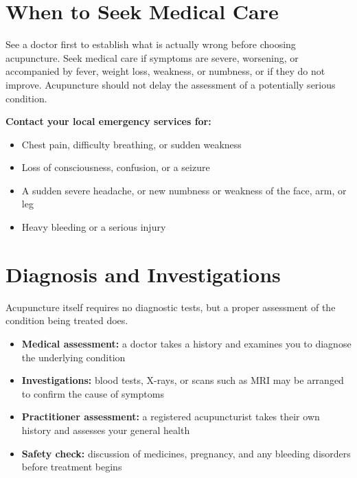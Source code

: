 \section*{When to Seek Medical Care}
See a doctor first to establish what is actually wrong before choosing acupuncture. Seek medical care if symptoms are severe, worsening, or accompanied by fever, weight loss, weakness, or numbness, or if they do not improve. Acupuncture should not delay the assessment of a potentially serious condition.

\textbf{Contact your local emergency services for:}
\begin{itemize}
    \item Chest pain, difficulty breathing, or sudden weakness
    \item Loss of consciousness, confusion, or a seizure
    \item A sudden severe headache, or new numbness or weakness of the face, arm, or leg
    \item Heavy bleeding or a serious injury
\end{itemize}

\section*{Diagnosis and Investigations}
Acupuncture itself requires no diagnostic tests, but a proper assessment of the condition being treated does.

\begin{itemize}
    \item \textbf{Medical assessment:} a doctor takes a history and examines you to diagnose the underlying condition
    \item \textbf{Investigations:} blood tests, X-rays, or scans such as MRI may be arranged to confirm the cause of symptoms
    \item \textbf{Practitioner assessment:} a registered acupuncturist takes their own history and assesses your general health
    \item \textbf{Safety check:} discussion of medicines, pregnancy, and any bleeding disorders before treatment begins
\end{itemize}

